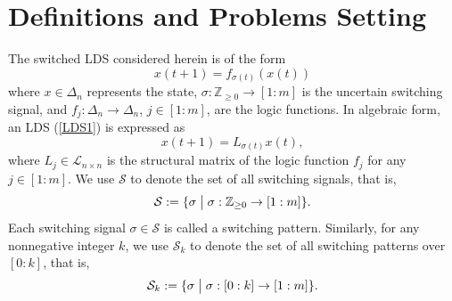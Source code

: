 \documentclass[11pt,onecolumn]{article}
\begin{document}

\section{Definitions and Problems Setting}\label{SectionDefinitions}



The switched LDS considered herein is of the form \begin{equation}\label{LDS1}
x(t+1)=f_{\sigma(t)}(x(t))
\end{equation}
where $x\in\Delta_n$ represents the state, $\sigma:\mathbb Z_{\geq0}\rightarrow[1:m]$ is the uncertain switching signal, and $f_j: \Delta_n\rightarrow\Delta_n$, $j\in[1:m]$,  are the logic functions. In algebraic form, an LDS (\ref{LDS1}) is expressed as
\begin{equation}\label{LDS-AlgebraicForm1}
   x(t+1)=L_{\sigma(t)} x(t),
\end{equation}
where $L_j\in\mathscr L_{n\times n}$ is the structural matrix of the logic function $f_j$ for any $j\in[1:m]$. We use $\mathcal S$ to denote the set of all switching signals, that is, \[\mathcal S:=\{\sigma\bigm|\sigma:\mathbb Z_{\geq0}\rightarrow[1:m] \}.\] Each switching signal $\sigma\in\mathcal S$ is called a switching pattern. Similarly, for any nonnegative integer $k$, we use $\mathcal S_k$ to denote the set of all switching patterns over $[0:k]$, that is,
\[\mathcal S_k:=\{\sigma\bigm|\sigma:[0:k]\rightarrow[1:m] \}.\]
\end{document}
